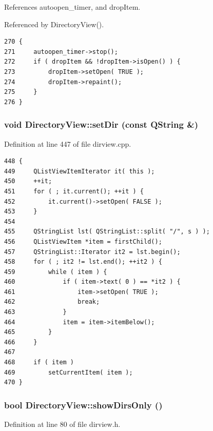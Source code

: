 References autoopen\_\-timer, and drop\-Item.

Referenced by Directory\-View().



\footnotesize\begin{verbatim}270 {
271     autoopen_timer->stop();
272     if ( dropItem && !dropItem->isOpen() ) {
273         dropItem->setOpen( TRUE );
274         dropItem->repaint();
275     }
276 }
\end{verbatim}\normalsize 
{}
\subsubsection{\setlength{\rightskip}{0pt plus 5cm}void Directory\-View::set\-Dir (const QString \&)\hspace{0.3cm}{\tt  [slot]}}\label{classDirectoryView_DirectoryViewi0}




Definition at line 447 of file dirview.cpp.



\footnotesize\begin{verbatim}448 {
449     QListViewItemIterator it( this );
450     ++it;
451     for ( ; it.current(); ++it ) {
452         it.current()->setOpen( FALSE );
453     }
454 
455     QStringList lst( QStringList::split( "/", s ) );
456     QListViewItem *item = firstChild();
457     QStringList::Iterator it2 = lst.begin();
458     for ( ; it2 != lst.end(); ++it2 ) {
459         while ( item ) {
460             if ( item->text( 0 ) == *it2 ) {
461                 item->setOpen( TRUE );
462                 break;
463             }
464             item = item->itemBelow();
465         }
466     }
467 
468     if ( item )
469         setCurrentItem( item );
470 }
\end{verbatim}\normalsize 
{}
\subsubsection{\setlength{\rightskip}{0pt plus 5cm}bool Directory\-View::show\-Dirs\-Only ()\hspace{0.3cm}{\tt  [inline]}}\label{classDirectoryView_DirectoryViewa1}




Definition at line 80 of file dirview.h.

